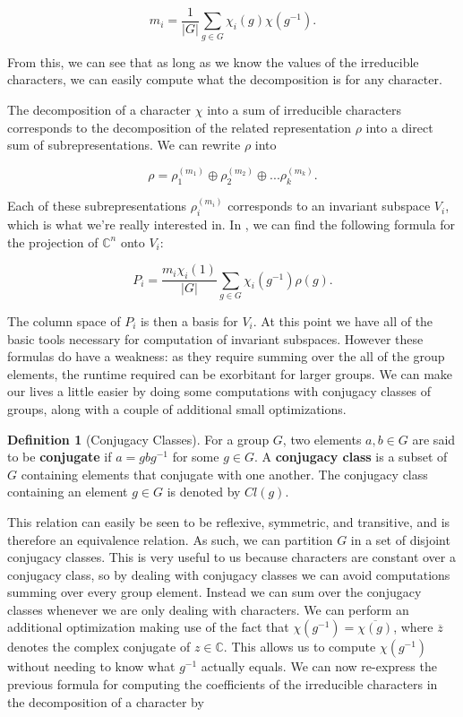 \documentclass[11pt]{article} %
\theoremstyle{definition}
\newtheorem{definition}[theorem]{Definition}
\theoremstyle{remark}
\begin{document}
\begin{equation}
m_i = \frac{1}{|G|} \sum_{g \in G} \chi_i(g) \chi(g^{-1}).
\end{equation}

From this, we can see that as long as we know the values of the irreducible characters, we can easily compute what the decomposition is for any character.

The decomposition of a character $\chi$ into a sum of irreducible characters corresponds to the decomposition of the related representation $\rho$ into a direct sum of subrepresentations. We can rewrite $\rho$ into

	$$ \rho = \rho_1^{(m_1)} \oplus \rho_2^{(m_2)} \oplus ... \rho_k^{(m_k)}. $$

Each of these subrepresentations $\rho_i^{(m_i)}$ corresponds to an invariant subspace $V_i$, which is what we're really interested in. In \cite{char}, we can find the following formula for the projection of $\mathbb{C}^n$ onto $V_i$:

\begin{equation} \label{eq:projection}
P_i = \frac{m_i\chi_i(1)}{|G|} \sum_{g \in G} \chi_i(g^{-1})\rho(g).
\end{equation}

The column space of $P_i$ is then a basis for $V_i$. At this point we have all of the basic tools necessary for computation of invariant subspaces. However these formulas do have a weakness: as they require summing over the all of the group elements, the runtime required can be exorbitant for larger groups. We can make our lives a little easier by doing some computations with conjugacy classes of groups, along with a couple of additional small optimizations.

\begin{definition}[Conjugacy Classes]
For a group $G$, two elements $a, b \in G$ are said to be \textbf{conjugate} if $a = gbg^{-1}$ for some $g \in G$. A \textbf{conjugacy class} is a subset of $G$ containing elements that conjugate with one another. The conjugacy class containing an element $g \in G$ is denoted by $Cl(g)$.
\end{definition}

This relation can easily be seen to be reflexive, symmetric, and transitive, and is therefore an equivalence relation. As such, we can partition $G$ in a set of disjoint conjugacy classes. This is very useful to us because characters are constant over a conjugacy class, so by dealing with conjugacy classes we can avoid computations summing over every group element. Instead we can sum over the conjugacy classes whenever we are only dealing with characters. We can perform an additional optimization making use of the fact that $\chi(g^{-1}) = \overline{\chi(g)}$, where $\overline z$ denotes the complex conjugate of $z \in \mathbb{C}$. This allows us to compute $\chi(g^{-1})$ without needing to know what $g^{-1}$ actually equals. We can now re-express the previous formula for computing the coefficients of the irreducible characters in the decomposition of a character by
\end{document}
